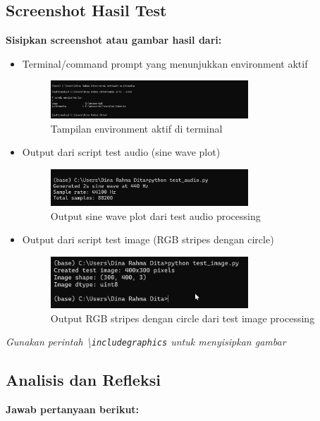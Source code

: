 \documentclass[11pt,a4paper]{article}
\begin{document}
\subsection{Screenshot Hasil Test}
\textbf{Sisipkan screenshot atau gambar hasil dari:}
\begin{itemize}
    \item Terminal/command prompt yang menunjukkan environment aktif
    \begin{figure}[H]
        \centering
        \includegraphics[width=0.7\textwidth]{Figure/ss/2.png}
    \caption{Tampilan environment aktif di terminal}
    \label{fig:env_terminal}
    \end{figure}

    \item Output dari script test audio (sine wave plot)
    \begin{figure}[H]
        \centering
        \includegraphics[width=0.7\textwidth]{Figure/ss/14.png}
        \caption{Output sine wave plot dari test audio processing}
        \label{fig:audio_sine_wave}
    \end{figure}

    \item Output dari script test image (RGB stripes dengan circle)
    \begin{figure}[H]
        \centering
        \includegraphics[width=0.7\textwidth]{Figure/ss/15.png}
    \caption{Output RGB stripes dengan circle dari test image processing}
    \label{fig:image_rgb}
    \end{figure}
\end{itemize}

\textit{Gunakan perintah \textbackslash\texttt{includegraphics} untuk menyisipkan gambar}

\subsection{Analisis dan Refleksi}
\textbf{Jawab pertanyaan berikut:}
\end{document}
